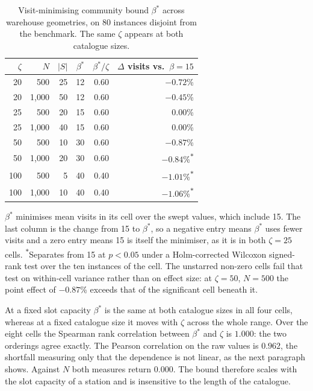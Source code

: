 \documentclass[11pt]{article}
\newcommand{\tbl}[1]{\caption{#1}}
\newcommand{\tabnote}[1]{\vspace{2pt}\footnotesize\raggedright #1\par}
\begin{document}
\begin{table}[H]
\centering
\tbl{Visit-minimising community bound $\beta^\ast$ across warehouse geometries, on 80 instances disjoint from the benchmark. The same $\zeta$ appears at both catalogue sizes.}
{\small\begin{tabular*}{\textwidth}{@{\extracolsep{\fill}}rrrrrr@{}}
\toprule
$\zeta$ & $N$ & $|S|$ & $\beta^\ast$ & $\beta^\ast/\zeta$ & $\Delta$ visits vs.\ $\beta=15$ \\
\midrule
20  & 500   & 25 & 12 & 0.60 & $-0.72$\% \\
20  & 1{,}000 & 50 & 12 & 0.60 & $-0.45$\% \\
25  & 500   & 20 & 15 & 0.60 & $0.00$\% \\
25  & 1{,}000 & 40 & 15 & 0.60 & $0.00$\% \\
50  & 500   & 10 & 30 & 0.60 & $-0.87$\% \\
50  & 1{,}000 & 20 & 30 & 0.60 & $-0.84$\%\textsuperscript{$\ast$} \\
100 & 500   & 5  & 40 & 0.40 & $-1.01$\%\textsuperscript{$\ast$} \\
100 & 1{,}000 & 10 & 40 & 0.40 & $-1.06$\%\textsuperscript{$\ast$} \\
\bottomrule
\end{tabular*}}
\tabnote{$\beta^\ast$ minimises mean visits in its cell over the swept values, which include 15. The last column is the change from 15 to $\beta^\ast$, so a negative entry means $\beta^\ast$ uses fewer visits and a zero entry means 15 is itself the minimiser, as it is in both $\zeta=25$ cells. \textsuperscript{$\ast$}Separates from 15 at $p<0.05$ under a Holm-corrected Wilcoxon signed-rank test over the ten instances of the cell. The unstarred non-zero cells fail that test on within-cell variance rather than on effect size: at $\zeta=50$, $N=500$ the point effect of $-0.87$\% exceeds that of the significant cell beneath it.}
\label{tab:capsweep}
\end{table}

At a fixed slot capacity $\beta^\ast$ is the same at both catalogue sizes in all four cells,
whereas at a fixed catalogue size it moves with $\zeta$ across the whole range. Over the eight
cells the Spearman rank correlation between $\beta^\ast$ and $\zeta$ is $1.000$: the two
orderings agree exactly. The Pearson correlation on the raw values is $0.962$, the shortfall
measuring only that the dependence is not linear, as the next paragraph shows. Against $N$
both measures return $0.000$. The bound therefore scales with the slot capacity of a station
and is insensitive to the length of the catalogue.
\end{document}
